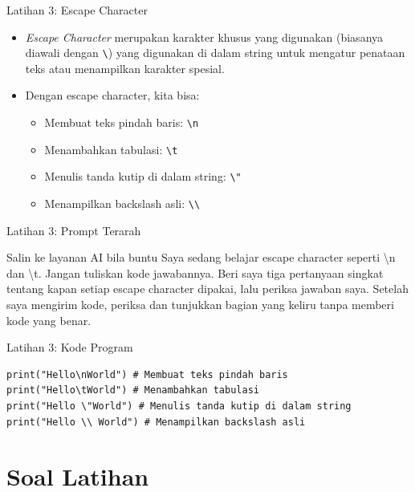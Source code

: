 \documentclass[aspectratio=169, table]{beamer}
\begin{document}
\begin{frame}[fragile]{Latihan 3: Escape Character}
\begin{itemize}
\item \textit{Escape Character} merupakan karakter khusus yang digunakan (biasanya diawali dengan \texttt{\textbackslash}) yang digunakan di dalam string untuk mengatur penataan teks atau menampilkan karakter spesial.
\item Dengan escape character, kita bisa:

\begin{itemize}
    \item Membuat teks pindah baris: \texttt{\textbackslash n}
    \item Menambahkan tabulasi: \texttt{\textbackslash t}
    \item Menulis tanda kutip di dalam string: \texttt{\textbackslash "}
    \item Menampilkan backslash asli: \texttt{\textbackslash\textbackslash}
\end{itemize}

\end{itemize}
\end{frame}

\begin{frame}{Latihan 3: Prompt Terarah}
\begin{block}{Salin ke layanan AI bila buntu}
\small Saya sedang belajar escape character seperti \textbackslash n dan \textbackslash t. Jangan tuliskan kode jawabannya. Beri saya tiga pertanyaan singkat tentang kapan setiap escape character dipakai, lalu periksa jawaban saya. Setelah saya mengirim kode, periksa dan tunjukkan bagian yang keliru tanpa memberi kode yang benar.
\end{block}
\end{frame}

\begin{frame}[fragile]{Latihan 3: Kode Program}
\begin{lstlisting}[style=PythonStyle, firstnumber=1]
print("Hello\nWorld") # Membuat teks pindah baris
print("Hello\tWorld") # Menambahkan tabulasi
print("Hello \"World") # Menulis tanda kutip di dalam string
print("Hello \\ World") # Menampilkan backslash asli
\end{lstlisting}
\end{frame}

\section{Soal Latihan}
\end{document}
